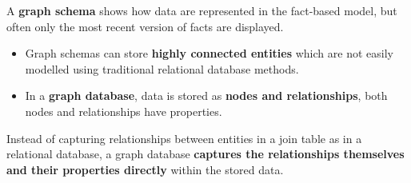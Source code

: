 A \textbf{graph schema} shows how data are represented in the fact-based model, but often only the most recent version of facts are displayed.
\begin{itemize}
    \item Graph schemas can store \textbf{highly connected entities} which are not easily modelled using traditional relational database methods.
    \item In a \textbf{graph database}, data is stored as \textbf{nodes and relationships}, both nodes and relationships have properties.
\end{itemize}

Instead of capturing relationships between entities in a join table as in a relational database, a graph database \textbf{captures the relationships themselves and their properties directly} within the stored data.
